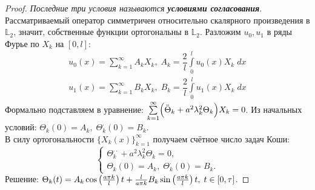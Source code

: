 \documentclass[../main.tex]{subfiles}
\begin{document}
\begin{proof}
\textit{Последние три условия называются \textbf{условиями согласования}}. \\
Рассматриваемый оператор симметричен относительно скалярного произведения в $\mathbb{L}_2$, значит, собственные функции ортогональны в $\mathbb{L}_2$. Разложим $u_0, u_1$ в ряды Фурье по $X_k$ на $[0, l]$:
\begin{align*}
	u_0(x) = \sum\limits_{k = 1}^{\infty} A_kX_k,\; A_k = \dfrac{2}{l} \int\limits_{0}^l u_0(x)X_k\;dx \\
	u_1(x) = \sum\limits_{k = 1}^{\infty} B_kX_k,\; B_k = \dfrac{2}{l} \int\limits_{0}^l u_1(x)X_k\;dx 
\end{align*}
Формально подставляем в уравнение: $\sum\limits_{k = 1}^{\infty} \Bigl( \ddot{\Theta}_k + a^2 \lambda_k^2\Theta_k \Bigr)X_k = 0$. Из начальных условий: $\Theta_k(0) = A_k,\; \Theta^{\cdotp}_k(0) = B_k$. \\
В силу ортогональности $\{X_k(x)\}_{k = 1}^{\infty}$ получаем счётное число задач Коши:
\begin{equation*}
\begin{cases}
	\Theta^{\cdotp \cdotp}_k + a^2 \lambda_k^2\Theta_k = 0, \\
	\Theta_k(0) = A_k,\; \Theta^{\cdotp}_k(0) = B_k.
\end{cases}
\end{equation*}
Решение: $\Theta_k(t) = A_k\cos \left(\frac{a \pi k}{l}\right)t + \frac{l}{a \pi k}B_k \sin \left(\frac{a \pi k}{l}\right)t,\; t \in [0, \tau]$. 
\end{proof}
\end{document}
